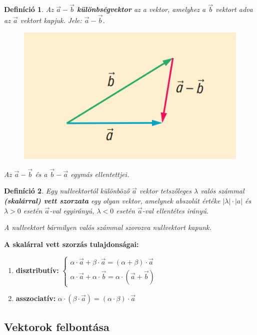 \documentclass[12pt,a4paper]{article}
\newtheorem{definition}{Definíció} [section]
\begin{document}
\begin{definition}
Az $\vec{a} - \vec{b}$ \textbf{különbségvektor} az a vektor, amelyhez a $\vec{b}$ vektort adva az $\vec{a}$ vektort kapjuk. Jele: $\vec{a} - \vec{b}$.
\begin{figure}[h!]
\centering
\includegraphics[scale=0.3]{geometry/kulonbseg_vektor}
\end{figure}

Az $\vec{a} - \vec{b}$ és a $\vec{b} - \vec{a}$ egymás ellentettjei.
\end{definition}

\begin{definition}
Egy nullvektortól különböző $\vec{a}$ vektor tetszőleges $\lambda$ valós számmal \textbf{(skalárral) vett szorzata} egy olyan vektor, amelynek abszolút értéke $|\lambda|\cdot |a|$ és $\lambda > 0$ esetén $\vec{a}$-val egyirányú, $\lambda < 0$ esetén $\vec{a}$-val ellentétes irányú.

A nullvektort bármilyen valós számmal szorozva nullvektort kapunk.
\end{definition}

\textbf{A skalárral vett szorzás tulajdonságai:}
\begin{enumerate}
\item \textbf{disztributív:} $\begin{cases} \alpha \cdot \vec{a} + \beta \cdot \vec{a} = (\alpha+\beta)\cdot \vec{a} \\ \alpha \cdot \vec{a} + \alpha \cdot \vec{b} = \alpha\cdot (\vec{a}+\vec{b}) \end{cases}$
\item \textbf{asszociatív:} $\alpha \cdot (\beta \cdot \vec{a}) = (\alpha \cdot \beta) \cdot \vec{a}$
\end{enumerate}

\subsection{Vektorok felbontása}
\end{document}
